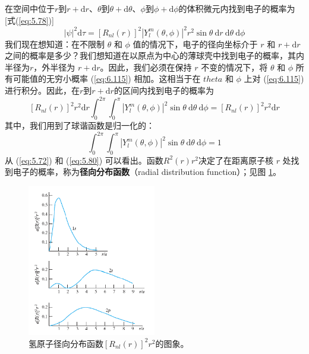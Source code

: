     在空间中位于$r$到$r+\mathrm{d}r$、$\theta$到$\theta+\mathrm{d}\theta$、$\phi$到$\phi+\mathrm{d}\phi$的体积微元内找到电子的概率为[式(\ref{eq:5.78})]
    \begin{equation}
        \left|\psi\right|^2\mathrm{d}\tau = \left[R_{nl}\left(r\right)\right]^2\left|Y_l^m\left(\theta,\phi\right)\right|^2r^2\sin\theta\:\mathrm{d}r\:\mathrm{d}\theta\:\mathrm{d}\phi
        \label{eq:6.115}
    \end{equation}
    我们现在想知道：在不限制 $\theta$ 和 $\phi$ 值的情况下，电子的径向坐标介于 $r$ 和 $r + \mathrm{d}r$ 之间的概率是多少？我们想知道在以原点为中心的薄球壳中找到电子的概率，其内半径为$r$，外半径为 $r + \mathrm{d}r$。因此，我们必须在保持 $r$ 不变的情况下，将 $\theta$ 和 $\phi$ 所有可能值的无穷小概率 (\ref{eq:6.115}) 相加。这相当于在 $theta$ 和 $\phi$ 上对 (\ref{eq:6.115}) 进行积分。因此，在$r$到$r+\mathrm{d}r$的区间内找到电子的概率为
    \begin{equation}
        \left[R_{nl}\left(r\right)\right]^2r^2\mathrm{d}r\int_{0}^{2\pi}\int_{0}^{\pi}\left|Y_l^m\left(\theta,\phi\right)\right|^2\sin\theta\:\mathrm{d}\theta\:\mathrm{d}\phi = \left[R_{nl}\left(r\right)\right]^2r^2\mathrm{d}r
        \label{eq:6.116}
    \end{equation}
    其中，我们用到了球谐函数是归一化的：
    \begin{equation}
        \boxed{
            \int_{0}^{2\pi}\int_{0}^{\pi}\left|Y_l^m\left(\theta,\phi\right)\right|^2\sin\theta\:\mathrm{d}\theta\:\mathrm{d}\phi = 1
        }
        \label{eq:6.117}
    \end{equation}
    从 (\ref{eq:5.72}) 和 (\ref{eq:5.80}) 可以看出。函数$R^2\left(r\right)r^2$决定了在距离原子核 $r$ 处找到电子的概率，称为\textbf{径向分布函数}（radial distribution function）；见图 \ref{fig:6.9}。
    \begin{figure}[h!]
        \centering
        \includegraphics[width=0.5\textwidth]{Figures/6.9.png}
        \caption{氢原子径向分布函数$\left[R_{nl}\left(r\right)\right]^2r^2$的图象。}
        \label{fig:6.9}
    \end{figure}

